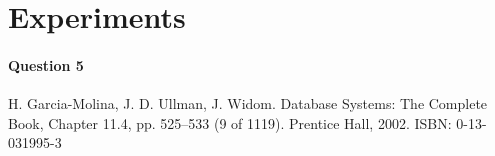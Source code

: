 \documentclass[a4paper, 11pt]{article}
\begin{document}


\section{Experiments} %
\label{sec:experiments}

\paragraph{Question 5} %
\label{par:question_5}




\begin{thebibliography}{9}

    H. Garcia-Molina, J. D. Ullman, J. Widom.
    Database Systems: The Complete Book,
    Chapter 11.4, pp. 525–533 (9 of 1119).
    Prentice Hall, 2002.
    ISBN: 0-13-031995-3
\end{thebibliography}
\end{document}
